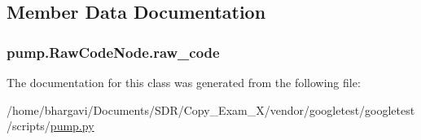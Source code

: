 \subsection{Member Data Documentation}
\subsubsection[{\texorpdfstring{raw\+\_\+code}{raw_code}}]{\setlength{\rightskip}{0pt plus 5cm}pump.\+Raw\+Code\+Node.\+raw\+\_\+code}\hypertarget{classpump_1_1_raw_code_node_ab36224d959e0d8f803e9fac8e6a0baab}{}\label{classpump_1_1_raw_code_node_ab36224d959e0d8f803e9fac8e6a0baab}


The documentation for this class was generated from the following file\+:\begin{DoxyCompactItemize}
\item 
/home/bhargavi/\+Documents/\+S\+D\+R/\+Copy\+\_\+\+Exam\+\_\+X/vendor/googletest/googletest/scripts/\hyperlink{pump_8py}{pump.\+py}\end{DoxyCompactItemize}
